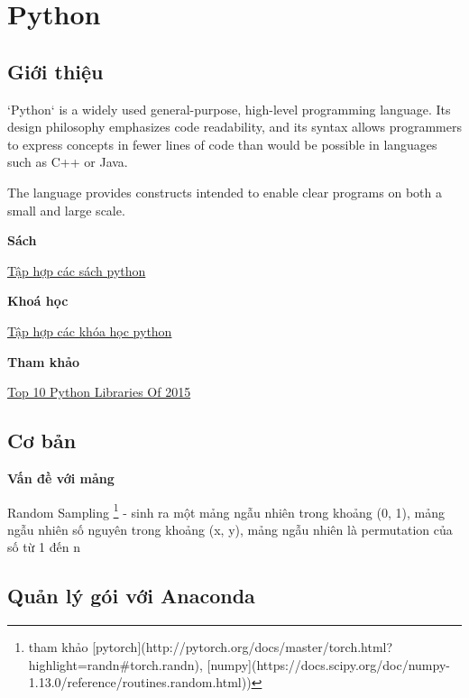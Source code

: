 \chapter{Python}

\section{Giới thiệu}

\begin{item}
  \item `Python` is a widely used general-purpose, high-level programming language. Its design philosophy emphasizes code readability, and its syntax allows programmers to express concepts in fewer lines of code than would be possible in languages such as C++ or Java.
  \item The language provides constructs intended to enable clear programs on both a small and large scale.
\end{item}


\textbf{Sách}

\href{https://docs.google.com/document/d/1gQFMXZtynpuTenoOQNGCHttArT4NspTWcyJQr5ps9Mk/edit?usp=sharing}{Tập hợp các sách python}

\textbf{Khoá học}

\href{1frO9QYhgsXbMzcyXoA4czWkxTWF8RBTJVf9uoO1rElU}{Tập hợp các khóa học python}

\textbf{Tham khảo}

\href{http://blog.tryolabs.com/2015/12/15/top-10-python-libraries-of-2015/}{Top 10 Python Libraries Of 2015}

\section{Cơ bản}

\textbf{Vấn đề với mảng}

\begin{item}
  \item Random Sampling \footnote{tham khảo [pytorch](http://pytorch.org/docs/master/torch.html?highlight=randn#torch.randn), [numpy](https://docs.scipy.org/doc/numpy-1.13.0/reference/routines.random.html))} - sinh ra một mảng ngẫu nhiên trong khoảng (0, 1), mảng ngẫu nhiên số nguyên trong khoảng (x, y), mảng ngẫu nhiên là permutation của số từ 1 đến n
\end{item}

\section{Quản lý gói với Anaconda}

